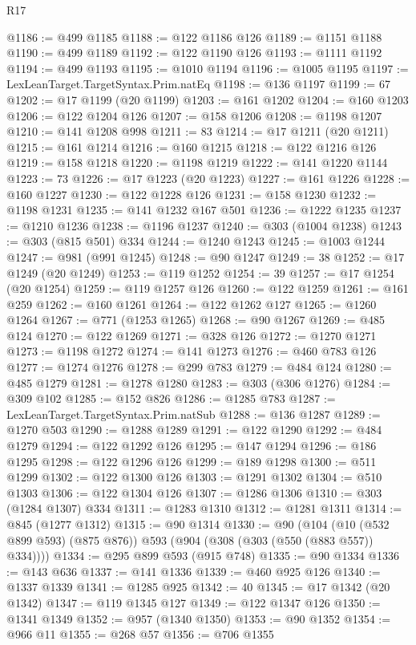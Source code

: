 \begin{lexlean}{R17}
\begin{coremodule}
{{{{{{{{{{{{{{{{{{{{{{{{{{{{{{{{{{{{{{{{{{{{{{{{{{{{{{{{{{{{{{{{{{{{{{{{{{{{{{{{{{{{{{{{{{{{{{{{{{{{{{{{{{{@1186 := @499 @1185
@1188 := @122 @1186 @126
@1189 := @1151 @1188
@1190 := @499 @1189
@1192 := @122 @1190 @126
@1193 := @1111 @1192
@1194 := @499 @1193
@1195 := @1010 @1194
@1196 := @1005 @1195
@1197 := LexLeanTarget.TargetSyntax.Prim.natEq
@1198 := @136 @1197
@1199 := 67
@1202 := @17 @1199 (@20 @1199)
@1203 := @161 @1202
@1204 := @160 @1203
@1206 := @122 @1204 @126
@1207 := @158 @1206
@1208 := @1198 @1207
@1210 := @141 @1208 @998
@1211 := 83
@1214 := @17 @1211 (@20 @1211)
@1215 := @161 @1214
@1216 := @160 @1215
@1218 := @122 @1216 @126
@1219 := @158 @1218
@1220 := @1198 @1219
@1222 := @141 @1220 @1144
@1223 := 73
@1226 := @17 @1223 (@20 @1223)
@1227 := @161 @1226
@1228 := @160 @1227
@1230 := @122 @1228 @126
@1231 := @158 @1230
@1232 := @1198 @1231
@1235 := @141 @1232 @167 @501
@1236 := @1222 @1235
@1237 := @1210 @1236
@1238 := @1196 @1237
@1240 := @303 (@1004 @1238)
@1243 := @303 (@815 @501) @334
@1244 := @1240 @1243
@1245 := @1003 @1244
@1247 := @981 (@991 @1245)
@1248 := @90 @1247
@1249 := 38
@1252 := @17 @1249 (@20 @1249)
@1253 := @119 @1252
@1254 := 39
@1257 := @17 @1254 (@20 @1254)
@1259 := @119 @1257 @126
@1260 := @122 @1259
@1261 := @161 @259
@1262 := @160 @1261
@1264 := @122 @1262 @127
@1265 := @1260 @1264
@1267 := @771 (@1253 @1265)
@1268 := @90 @1267
@1269 := @485 @124
@1270 := @122 @1269
@1271 := @328 @126
@1272 := @1270 @1271
@1273 := @1198 @1272
@1274 := @141 @1273
@1276 := @460 @783 @126
@1277 := @1274 @1276
@1278 := @299 @783
@1279 := @484 @124
@1280 := @485 @1279
@1281 := @1278 @1280
@1283 := @303 (@306 @1276)
@1284 := @309 @102
@1285 := @152 @826
@1286 := @1285 @783
@1287 := LexLeanTarget.TargetSyntax.Prim.natSub
@1288 := @136 @1287
@1289 := @1270 @503
@1290 := @1288 @1289
@1291 := @122 @1290
@1292 := @484 @1279
@1294 := @122 @1292 @126
@1295 := @147 @1294
@1296 := @186 @1295
@1298 := @122 @1296 @126
@1299 := @189 @1298
@1300 := @511 @1299
@1302 := @122 @1300 @126
@1303 := @1291 @1302
@1304 := @510 @1303
@1306 := @122 @1304 @126
@1307 := @1286 @1306
@1310 := @303 (@1284 @1307) @334
@1311 := @1283 @1310
@1312 := @1281 @1311
@1314 := @845 (@1277 @1312)
@1315 := @90 @1314
@1330 := @90
    (@104 (@10 (@532 @899 @593) (@875 @876)) @593 (@904 (@308 (@303 (@550 (@883 @557)) @334))))
@1334 := @295 @899 @593 (@915 @748)
@1335 := @90 @1334
@1336 := @143 @636
@1337 := @141 @1336
@1339 := @460 @925 @126
@1340 := @1337 @1339
@1341 := @1285 @925
@1342 := 40
@1345 := @17 @1342 (@20 @1342)
@1347 := @119 @1345 @127
@1349 := @122 @1347 @126
@1350 := @1341 @1349
@1352 := @957 (@1340 @1350)
@1353 := @90 @1352
@1354 := @966 @11
@1355 := @268 @57
@1356 := @706 @1355
}}}}}}}}}}}}}}}}}}}}}}}}}}}}}}}}}}}}}}}}}}}}}}}}}}}}}}}}}}}}}}}}}}}}}}}}}}}}}}}}}}}}}}}}}}}}}}}}}}}}}}}}}}}
\end{coremodule}
\end{lexlean}
